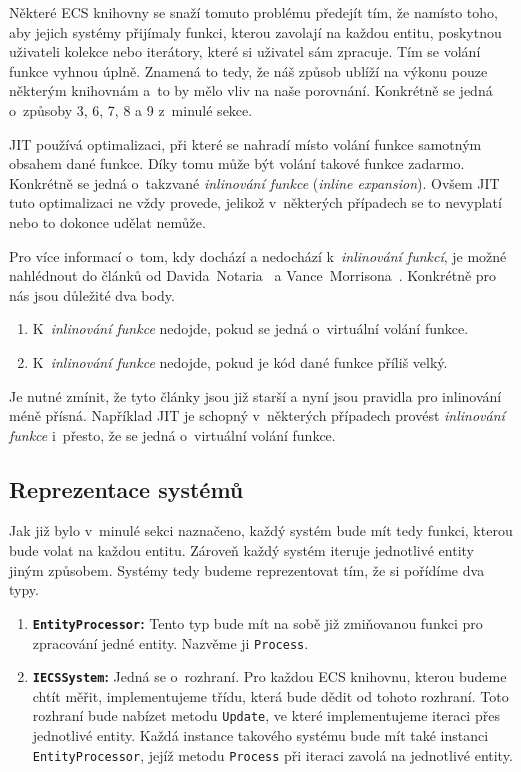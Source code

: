 Některé ECS knihovny se snaží tomuto problému předejít tím, že namísto toho, aby jejich systémy přijímaly funkci, kterou zavolají na každou entitu, poskytnou uživateli kolekce nebo iterátory, které si uživatel sám zpracuje. Tím se volání funkce vyhnou úplně. Znamená to tedy, že náš způsob ublíží na výkonu pouze některým knihovnám a~to by mělo vliv na naše porovnání. Konkrétně se jedná o~způsoby 3, 6, 7, 8 a 9 z~minulé sekce.

JIT používá optimalizaci, při které se nahradí místo volání funkce samotným obsahem dané funkce. Díky tomu může být volání takové funkce zadarmo. Konkrétně se jedná o~takzvané \textit{inlinování funkce} (\textit{inline expansion}). Ovšem JIT tuto optimalizaci ne vždy provede, jelikož v~některých případech se to nevyplatí nebo to dokonce udělat nemůže.

Pro více informací o~tom, kdy dochází a nedochází k~\textit{inlinování funkcí}, je možné nahlédnout do článků od Davida~Notaria~\cite{Notario_2004} a Vance~Morrisona~\cite{Morrison_2008}. Konkrétně pro nás jsou důležité dva body.

\begin{enumerate}
    \item K~\textit{inlinování funkce} nedojde, pokud se jedná o~virtuální volání funkce.
    \item K~\textit{inlinování funkce} nedojde, pokud je kód dané funkce příliš velký.
\end{enumerate}

Je nutné zmínit, že tyto články jsou již starší a nyní jsou pravidla pro inlinování méně přísná. Například JIT je schopný v~některých případech provést \textit{inlinování funkce} i~přesto, že se jedná o~virtuální volání funkce.

\subsection{Reprezentace systémů}
Jak již bylo v~minulé sekci naznačeno, každý systém bude mít tedy funkci, kterou bude volat na každou entitu. Zároveň každý systém iteruje jednotlivé entity jiným způsobem. Systémy tedy budeme reprezentovat tím, že si pořídíme dva typy.

\begin{enumerate}
    \item \textbf{\texttt{EntityProcessor}:} Tento typ bude mít na sobě již zmiňovanou funkci pro zpracování jedné entity. Nazvěme ji \verb|Process|.
    \item \textbf{\texttt{IECSSystem}:} Jedná se o~rozhraní. Pro každou ECS knihovnu, kterou budeme chtít měřit, implementujeme třídu, která bude dědit od tohoto rozhraní. Toto rozhraní bude nabízet metodu \verb|Update|, ve které implementujeme iteraci přes jednotlivé entity. Každá instance takového systému bude mít také instanci \verb|EntityProcessor|, jejíž metodu \verb|Process| při iteraci zavolá na jednotlivé entity.
\end{enumerate}

